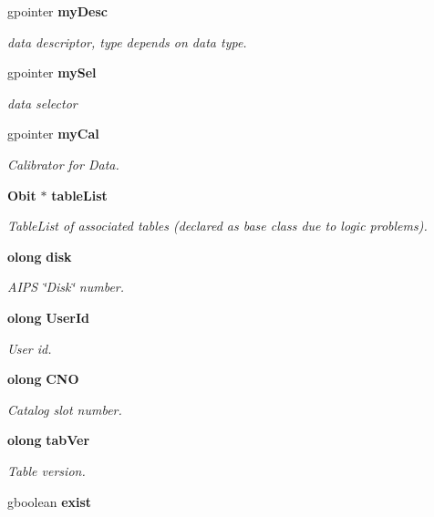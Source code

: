\begin{CompactItemize}
gpointer {\bf my\-Desc}
\begin{CompactList}\small\item\em data descriptor, type depends on data type. \item\end{CompactList}\item 
gpointer {\bf my\-Sel}
\begin{CompactList}\small\item\em data selector \item\end{CompactList}\item 
gpointer {\bf my\-Cal}
\begin{CompactList}\small\item\em Calibrator for Data. \item\end{CompactList}\item 
{\bf Obit} $\ast$ {\bf table\-List}
\begin{CompactList}\small\item\em Table\-List of associated tables (declared as base class due to logic problems). \item\end{CompactList}\item 
{\bf olong} {\bf disk}
\begin{CompactList}\small\item\em AIPS \char`\"{}Disk\char`\"{} number. \item\end{CompactList}\item 
{\bf olong} {\bf User\-Id}
\begin{CompactList}\small\item\em User id. \item\end{CompactList}\item 
{\bf olong} {\bf CNO}
\begin{CompactList}\small\item\em Catalog slot number. \item\end{CompactList}\item 
{\bf olong} {\bf tab\-Ver}
\begin{CompactList}\small\item\em Table version. \item\end{CompactList}\item 
gboolean {\bf exist}
\item 

\end{CompactItemize}
